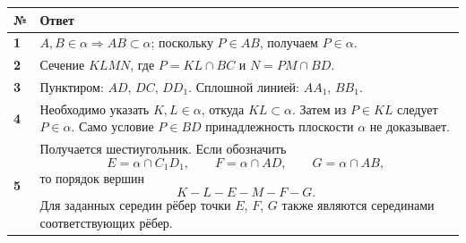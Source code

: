 \documentclass[a4paper,12pt]{article}
\begin{document}
\begin{tabularx}{\linewidth}{@{}>{\bfseries}p{0.8cm}X@{}}
\toprule
№ & Ответ \\
\midrule

1 &
$A,B\in\alpha\Rightarrow AB\subset\alpha$; поскольку $P\in AB$, получаем $P\in\alpha$.
\\

2 &
Сечение $KLMN$, где $P=KL\cap BC$ и $N=PM\cap BD$.
\\

3 &
Пунктиром: $AD$, $DC$, $DD_1$. Сплошной линией: $AA_1$, $BB_1$.
\\

4 &
Необходимо указать $K,L\in\alpha$, откуда $KL\subset\alpha$. Затем из $P\in KL$ следует $P\in\alpha$. Само условие $P\in BD$ принадлежность плоскости $\alpha$ не доказывает.
\\

5 &
Получается шестиугольник. Если обозначить
\[
E=\alpha\cap C_1D_1,
\qquad
F=\alpha\cap AD,
\qquad
G=\alpha\cap AB,
\]
то порядок вершин
\[
K-L-E-M-F-G.
\]
Для заданных середин рёбер точки $E$, $F$, $G$ также являются серединами соответствующих рёбер.
\\

\bottomrule
\end{tabularx}
\end{document}
